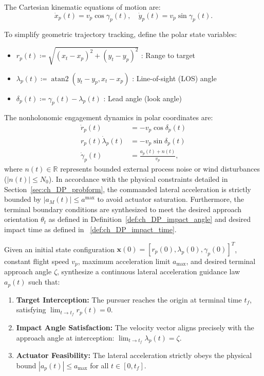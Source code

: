 The Cartesian kinematic equations of motion are:
\begin{equation}\label{eq:ch_sp_cartesian_kinematics}
	\dot{x}_p(t) = v_p \cos \gamma_p(t), \quad \dot{y}_p(t) = v_p \sin \gamma_p(t).
\end{equation}

To simplify geometric trajectory tracking, define the polar state variables:
\begin{itemize}
	\item $r_p(t) \coloneqq \sqrt{(x_t - x_p)^2 + (y_t - y_p)^2}$ : Range to target
	\item $\lambda_p(t) \coloneqq \operatorname{atan2}(y_t - y_p, x_t - x_p)$ : Line-of-sight (LOS) angle
	\item $\delta_p(t) \coloneqq \gamma_p(t) - \lambda_p(t)$ : Lead angle (look angle)
\end{itemize}

The nonholonomic engagement dynamics in polar coordinates are:
\begin{align}
	\dot{r}_p(t) &= -v_p \cos \delta_p(t) \label{eq:ch_sp_r_dot} \\
	r_p(t) \dot{\lambda}_p(t) &= -v_p \sin \delta_p(t) \label{eq:ch_sp_lambda_dot} \\
	\dot{\gamma}_p(t) &= \frac{a_p(t) + n(t)}{v_p}, \label{eq:ch_sp_gamma_dot}
\end{align}
where $n(t) \in \mathbb{R}$ represents bounded external process noise or wind disturbances ($|n(t)| \le N_0$).
In accordance with the physical constraints detailed in Section~\ref{sec:ch_DP_probform}, the commanded lateral acceleration is strictly bounded by $|a_M(t)| \le a^{\max}$ to avoid actuator saturation. Furthermore, the terminal boundary conditions are synthesized to meet the desired approach orientation $\theta_t$ as defined in Definition~\ref{def:ch_DP_impact_angle} and desired impact time as defined in ~\ref{def:ch_DP_impact_time}.
\begin{problem}\label{prob:ch_sp_main_problem}
Given an initial state configuration $\mathbf{x}(0) = [r_p(0), \lambda_p(0), \gamma_p(0)]^T$, constant flight speed $v_p$, maximum acceleration limit $a_{\max}$, and desired terminal approach angle $\zeta$, synthesize a continuous lateral acceleration guidance law $a_p(t)$ such that:
\begin{enumerate}
    \item \textbf{Target Interception:} The pursuer reaches the origin at terminal time $t_f$, satisfying $\lim_{t \to t_f} r_p(t) = 0$.
    \item \textbf{Impact Angle Satisfaction:} The velocity vector aligns precisely with the approach angle at interception: $\lim_{t \to t_f} \lambda_p(t) = \zeta$.
    \item \textbf{Actuator Feasibility:} The lateral acceleration strictly obeys the physical bound $|a_p(t)| \le a_{\max}$ for all $t \in [0, t_f]$.
\end{enumerate}
\end{problem}
